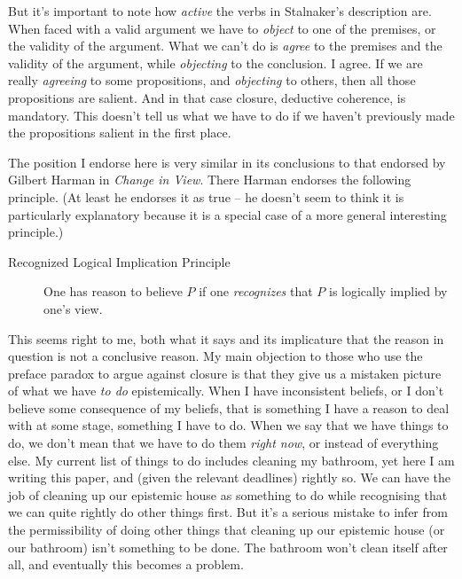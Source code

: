 But it's important to note how \textit{active} the verbs in Stalnaker's description are. When faced with a valid argument we have to \textit{object} to one of the premises, or the validity of the argument. What we can't do is \textit{agree} to the premises and the validity of the argument, while \textit{objecting} to the conclusion. I agree. If we are really \textit{agreeing} to some propositions, and \textit{objecting} to others, then all those propositions are salient. And in that case closure, deductive coherence, is mandatory. This doesn't tell us what we have to do if we haven't previously made the propositions salient in the first place.

The position I endorse here is very similar in its conclusions to that endorsed by Gilbert Harman in \textit{Change in View}. There Harman endorses the following principle. (At least he endorses it as true -- he doesn't seem to think it is particularly explanatory because it is a special case of a more general interesting principle.)

\begin{description}
\item[Recognized Logical Implication Principle] One has reason to believe \(P\) if one \textit{recognizes} that \(P\) is logically implied by one's view. \cite[17]{Harman1986}
\end{description}

\noindent This seems right to me, both what it says and its implicature that the reason in question is not a conclusive reason. My main objection to those who use the preface paradox to argue against closure is that they give us a mistaken picture of what we have \textit{to do} epistemically. When I have inconsistent beliefs, or I don't believe some consequence of my beliefs, that is something I have a reason to deal with at some stage, something I have to do. When we say that we have things to do, we don't mean that we have to do them \textit{right now}, or instead of everything else. My current list of things to do includes cleaning my bathroom, yet here I am writing this paper, and (given the relevant deadlines) rightly so. We can have the job of cleaning up our epistemic house as something to do while recognising that we can quite rightly do other things first. But it's a serious mistake to infer from the permissibility of doing other things that cleaning up our epistemic house (or our bathroom) isn't something to be done. The bathroom won't clean itself after all, and eventually this becomes a problem.


